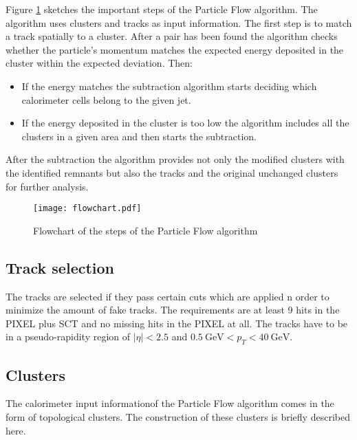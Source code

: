 Figure \ref{fig:pflowflowchart} sketches the important steps of the Particle Flow algorithm. The algorithm uses clusters and tracks as input information. The first step is to match a track spatially to a cluster. After a pair has been found the algorithm checks whether the particle's momentum matches the expected energy deposited in the cluster within the expected deviation. Then:
\begin{itemize}
\item If the energy matches the subtraction algorithm starts deciding which calorimeter cells belong to the given jet.
\item If the energy deposited in the cluster is too low the algorithm includes all the clusters in a given area and then starts the subtraction.
\end{itemize}


After the subtraction the algorithm provides not only the modified clusters with the identified remnants but also the tracks and the original unchanged clusters for further analysis.

\begin{figure}[h]
  \centering
  \texttt{[image: flowchart.pdf]}
  \caption[Flowchart of the steps of the Particle Flow algorithm]{Flowchart of the steps of the Particle Flow algorithm \cite{pflow16}}
  \label{fig:pflowflowchart}
\end{figure}

\subsection{Track selection}

The tracks are selected if they pass certain cuts which are applied n order to minimize the amount of fake tracks. The requirements are at least 9 hits in the PIXEL plus SCT and no missing hits in the PIXEL at all. The tracks have to be in a pseudo-rapidity region of $|\eta|<2.5$ and $\SI{0.5}{\GeV}<p_T<\SI{40}{\GeV}$.




\subsection{Clusters}

The calorimeter input informationof the Particle Flow algorithm comes in the form of topological clusters. The construction of these clusters is briefly described here.

